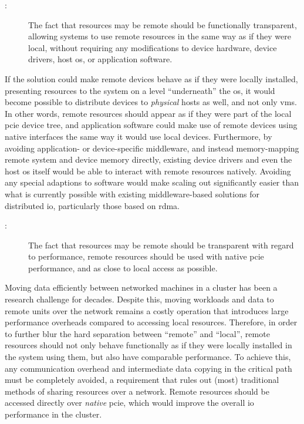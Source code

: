 \begin{description}
    \item[:] The fact that resources may be remote should be functionally transparent, allowing systems to use remote resources in the same way as if they were local, without requiring any modifications to device hardware, device drivers, host \gls{os}, or application software.
\end{description}
If the solution could make remote devices behave as if they were locally installed, presenting resources to the system on a level ``underneath'' the \gls{os}, it would become possible to distribute devices to \emph{physical} hosts as well, and not only \glspl{vm}. 
In other words, remote resources should appear as if they were part of the local \gls{pcie} device tree, and application software could make use of remote devices using native interfaces the same way it would use local devices.
%
Furthermore, by avoiding application- or device-specific middleware, and instead memory-mapping remote system and device memory directly, existing device drivers and even the host \gls{os} itself would be able to interact with remote resources natively.
Avoiding any special adaptions to software would make scaling out significantly easier than what is currently possible with existing middleware-based solutions for distributed \gls{io}, particularly those based on \gls{rdma}.

\begin{description}    
    \item[:] The fact that resources may be remote should be transparent with regard to performance, remote resources should be used with native \gls{pcie} performance, and as close to local access as possible.
\end{description}
Moving data efficiently between networked machines in a cluster has been a research challenge for decades. Despite this, moving workloads and data to remote units over the network remains a costly operation that introduces large performance overheads compared to accessing local resources. 
Therefore, in order to further blur the hard separation between ``remote'' and ``local'', remote resources should not only behave functionally as if they were locally installed in the system using them, but also have comparable performance.
To achieve this, any communication overhead and intermediate data copying in the critical path must be completely avoided, a requirement that rules out (most) traditional methods of sharing resources over a network. 
Remote resources should be accessed directly over \emph{native} \gls{pcie}, which would improve the overall \gls{io} performance in the cluster.

